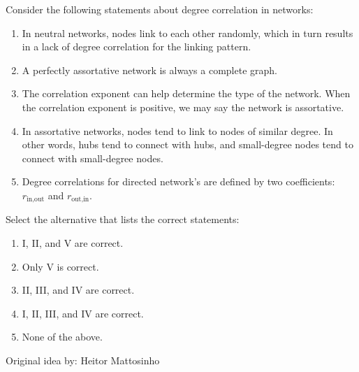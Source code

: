 
Consider the following statements about degree correlation in networks:

\begin{enumerate}[label={\Roman*.}]
    \item In neutral networks, nodes link to each other randomly, which in turn results in a lack of degree correlation for the linking pattern.
    \item A perfectly assortative network is always a complete graph.
    \item The correlation exponent can help determine the type of the network. When the correlation exponent is positive, we may say the network is assortative.
    \item In assortative networks, nodes tend to link to nodes of similar degree. In other words, hubs tend to connect with hubs, and small-degree nodes tend to connect with small-degree nodes.
    \item Degree correlations for directed network's are defined by two coefficients: $r_{\text{in},\text{out}}$ and $r_{\text{out},\text{in}}$.
\end{enumerate}

Select the alternative that lists the correct statements:

\begin{enumerate}[label={\Alph*.}]
    \item I, II, and V are correct.
    \item Only V is correct.
    \item II, III, and IV are correct.
    \item I, II, III, and IV are correct.
    \item None of the above.
\end{enumerate}

Original idea by: Heitor Mattosinho
